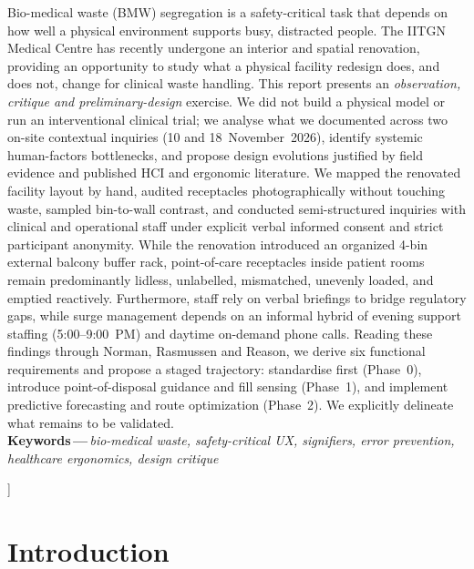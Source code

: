 \documentclass[10pt,twocolumn,a4paper]{article}
\begin{document}
{\begin{center}
\begin{minipage}{0.94\textwidth}
Bio-medical waste (BMW) segregation is a safety-critical task that depends on how well a physical environment supports busy, distracted people. The IITGN Medical Centre has recently undergone an interior and spatial renovation, providing an opportunity to study what a physical facility redesign does, and does not, change for clinical waste handling. This report presents an \emph{observation, critique and preliminary-design} exercise. We did not build a physical model or run an interventional clinical trial; we analyse what we documented across two on-site contextual inquiries (10 and 18~November~2026), identify systemic human-factors bottlenecks, and propose design evolutions justified by field evidence and published HCI and ergonomic literature. We mapped the renovated facility layout by hand, audited receptacles photographically without touching waste, sampled bin-to-wall contrast, and conducted semi-structured inquiries with clinical and operational staff under explicit verbal informed consent and strict participant anonymity. While the renovation introduced an organized 4-bin external balcony buffer rack, point-of-care receptacles inside patient rooms remain predominantly lidless, unlabelled, mismatched, unevenly loaded, and emptied reactively. Furthermore, staff rely on verbal briefings to bridge regulatory gaps, while surge management depends on an informal hybrid of evening support staffing (5:00--9:00~PM) and daytime on-demand phone calls. Reading these findings through Norman, Rasmussen and Reason, we derive six functional requirements and propose a staged trajectory: standardise first (Phase~0), introduce point-of-disposal guidance and fill sensing (Phase~1), and implement predictive forecasting and route optimization (Phase~2). We explicitly delineate what remains to be validated.\\[3pt]
{\sffamily\bfseries\color{navy}Keywords\,---\,}{\itshape bio-medical waste, safety-critical UX, signifiers, error prevention, healthcare ergonomics, design critique}
\end{minipage}
\end{center}
\vspace{4pt}
}]
\thispagestyle{first}

\section{Introduction}
\end{document}
